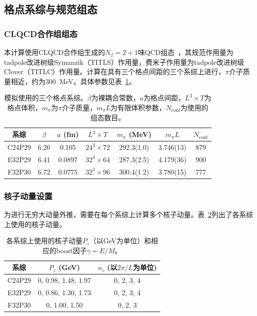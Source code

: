 \documentclass[12pt,a4paper]{ctexart}
\theoremstyle{definition}
\begin{document}
\subsection{格点系综与规范组态}

\subsubsection{CLQCD合作组组态}

本计算使用CLQCD合作组生成的$N_f = 2+1$味QCD组态~\cite{CLQCD-2024,CLQCD-2025}，其规范作用量为tadpole改进树级Symanzik（TITLS）作用量，费米子作用量为tadpole改进树级Clover（TITLC）作用量。计算在具有三个格点间距的三个系综上进行，$\pi$介子质量相近，约为300~MeV。具体参数见表~\ref{tab:ensembles}。

\begin{table}[H]
\centering
\caption{模拟使用的三个格点系综。$\beta$为裸耦合常数，$a$为格点间距，$L^3 \times T$为格点体积，$m_\pi$为$\pi$介子质量，$m_\pi L$为有限体积参数，$N_{\text{conf}}$为使用的组态数目。}
\label{tab:ensembles}
\begin{tabular}{ccccccc}
\toprule
系综 & $\beta$ & $a$ (fm) & $L^3 \times T$ & $m_\pi$ (MeV) & $m_\pi L$ & $N_{\text{conf}}$ \\
\midrule
C24P29 & 6.20 & 0.105  & $24^3 \times 72$ & 292.3(1.0) & 3.746(13) & 879 \\
E32P29 & 6.41 & 0.0897 & $32^3 \times 64$ & 287.3(2.5) & 4.179(36) & 900 \\
F32P30 & 6.72 & 0.0775 & $32^3 \times 96$ & 300.4(1.2) & 3.780(15) & 777 \\
\bottomrule
\end{tabular}
\end{table}

\subsubsection{核子动量设置}

为进行无穷大动量外推，需要在每个系综上计算多个核子动量。表~\ref{tab:momenta}列出了各系综上使用的核子动量。

\begin{table}[H]
\centering
\caption{各系综上使用的核子动量$P_z$（以GeV为单位）和相应的boost因子$\gamma = E/M$。}
\label{tab:momenta}
\begin{tabular}{ccc}
\toprule
系综 & $P_z$ (GeV) & $n_z$ (以$2\pi/L$为单位) \\
\midrule
C24P29 & 0, 0.98, 1.48, 1.97 & 0, 2, 3, 4 \\
E32P29 & 0, 0.86, 1.30, 1.73 & 0, 2, 3, 4 \\
F32P30 & 0, 1.00, 1.50       & 0, 2, 3 \\
\bottomrule
\end{tabular}
\end{table}
\end{document}
